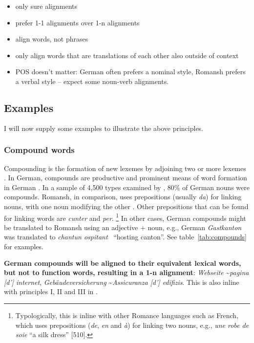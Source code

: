 \begin{itemize}
	\item only sure alignments
	\item prefer 1-1 alignments over 1-n alignments
	\item align words, not phrases
	\item only align words that are translations of each other also outside of context
	\item POS doesn't matter: German often prefers a nominal style, Romansh prefers a verbal style -- expect some noun-verb alignments.

\end{itemize}

\subsection{Examples}
I will now supply some examples to illustrate the above principles.
\subsubsection{Compound words}
Compounding is the formation of new lexemes by adjoining two or more lexemes \autocite{bauer1988}. In German, compounds are productive and prominent means of word formation in German \autocite{clematide2018}. 
In a sample of 4,500 types examined by \cite{clematide2018}, 80\% of German nouns were compounds.
Romansh, in comparison, uses prepositions (usually \emph{da}) for linking nouns, with one noun modifying the other \autocite{valladers}. Other prepositions that can be found for linking words are \emph{cunter} and \emph{per}.
\footnote{Typologically, this is inline with other Romance languages such as French, which uses prepositions (\emph{de}, \emph{en} and \emph{à}) for linking two nouns, e.g., \emph{une robe de soie} \enquote{a silk dress} \autocite{price2008}[510].}
In other cases, German compounds might be translated to Romansh using an adjective + noun, e.g., German \emph{Gastkanton} was translated to \emph{chantun ospitant} ~\enquote{hosting canton}.
See table~\ref{tab:compounds} for examples.

\textbf{German compounds will be aligned to their equivalent lexical words, but not to function words, resulting in a 1-n alignment}: \emph{Webseite} \textasciitilde  \emph{pagina [d'] internet}, \emph{Gebäudeversicherung} \textasciitilde \emph{Assicuranza [d'] edifizis}. 
This is also inline with principles I, II and III in \cite{clematide2018}.

